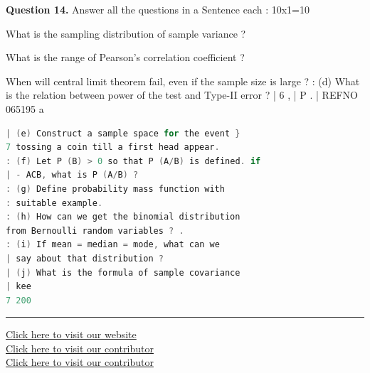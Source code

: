 \documentclass[11pt,a4paper]{article}
\begin{document}
\medskip\noindent\textbf{Question 14.} Answer all the questions in a Sentence each :
10x1=10
\begin{parts}
  \item What is the sampling distribution of sample
  variance ?
  \item What is the range of Pearson's correlation
  coefficient ?
  \item When will central limit theorem fail, even
if the sample size is large ?
  : (d) What is the relation between power of the
  test and Type-II error ? |
  6 ,
  | P .
  | REFNO 065195
  a
\end{parts}
\begin{lstlisting}[language=C]
| (e) Construct a sample space for the event }
7 tossing a coin till a first head appear.
: (f) Let P (B) > 0 so that P (A/B) is defined. if
| - ACB, what is P (A/B) ?
: (g) Define probability mass function with
: suitable example.
: (h) How can we get the binomial distribution
from Bernoulli random variables ? .
: (i) If mean = median = mode, what can we
| say about that distribution ?
| (j) What is the formula of sample covariance
| kee
7 200
\end{lstlisting}

\vfill
\rule{\linewidth}{0.4pt}
\begin{center}\small
\href{https://bhu-exam.vercel.app/}{Click here to visit our website}\\[4pt]\href{https://me-aryan.vercel.app/}{Click here to visit our contributor}\\[4pt]\href{https://quashan-me.vercel.app/}{Click here to visit our contributor}
\end{center}
\end{document}
